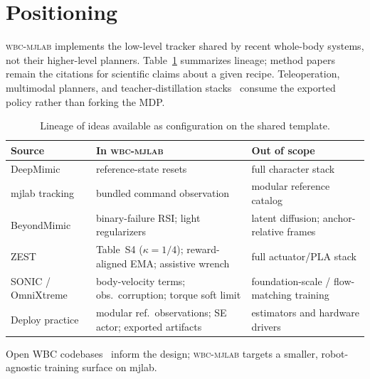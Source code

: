 \documentclass[11pt,a4paper]{article}
\begin{document}
\section{Positioning}
\label{sec:related}

\textsc{wbc-mjlab} implements the low-level tracker shared by recent whole-body
systems, not their higher-level planners. Table~\ref{tab:lineage} summarizes
lineage; method papers remain the citations for scientific claims about a given
recipe. Teleoperation, multimodal planners, and teacher-distillation
stacks~\citep{clot2026,m3imic2026,handoff2026} consume the exported policy
rather than forking the MDP.

\begin{table}[t]
  \centering
  \small
  \setlength{\tabcolsep}{3.5pt}
  \caption{Lineage of ideas available as configuration on the shared template.}
  \label{tab:lineage}
  \begin{tabular}{@{}p{2.5cm}p{5.2cm}p{4.4cm}@{}}
    \toprule
    Source & In \textsc{wbc-mjlab} & Out of scope \\
    \midrule
    DeepMimic~\citep{peng2018deepmimic} & reference-state resets
      & full character stack \\
    mjlab tracking~\citep{zakka2026mjlab} & bundled command observation
      & modular reference catalog \\
    BeyondMimic & binary-failure RSI; light regularizers
      & latent diffusion; anchor-relative frames \\
    ZEST & Table~S4 ($\kappa{=}1/4$); reward-aligned EMA;
      assistive wrench & full actuator/PLA stack \\
    SONIC / OmniXtreme & body-velocity terms; obs.\ corruption; torque soft limit
      & foundation-scale / flow-matching training \\
    Deploy practice & modular ref.\ observations; SE actor; exported artifacts
      & estimators and hardware drivers \\
    \bottomrule
  \end{tabular}
\end{table}

Open WBC codebases~\citep{hybridrobotics_wbt,nvlabs_groot_wbc2026} inform the
design; \textsc{wbc-mjlab} targets a smaller,
robot-agnostic training surface on mjlab.

\end{document}
